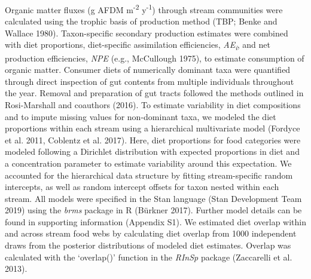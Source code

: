 \documentclass[
]{article}
\numberwithin{equation}
\begin{document}
Organic matter fluxes (g AFDM m\textsuperscript{-2}
y\textsuperscript{-1}) through stream communities were calculated using
the trophic basis of production method (TBP; Benke and Wallace 1980).
Taxon-specific secondary production estimates were combined with diet
proportions, diet-specific assimilation efficiencies,
\emph{AE\textsubscript{i}}, and net production efficiencies, \emph{NPE}
(e.g., McCullough 1975), to estimate consumption of organic matter.
Consumer diets of numerically dominant taxa were quantified through
direct inspection of gut contents from multiple individuals throughout
the year. Removal and preparation of gut tracts followed the methods
outlined in Rosi-Marshall and coauthors (2016). To estimate variability
in diet compositions and to impute missing values for non-dominant taxa,
we modeled the diet proportions within each stream using a hierarchical
multivariate model (Fordyce et al. 2011, Coblentz et al. 2017). Here,
diet proportions for food categories were modeled following a Dirichlet
distribution with expected proportions in diet and a concentration
parameter to estimate variability around this expectation. We accounted
for the hierarchical data structure by fitting stream-specific random
intercepts, as well as random intercept offsets for taxon nested within
each stream. All models were specified in the Stan language (Stan
Development Team 2019) using the \emph{brms} package in R (Bürkner
2017). Further model details can be found in supporting information
(Appendix S1). We estimated diet overlap within and across stream food
webs by calculating diet overlap from 1000 independent draws from the
posterior distributions of modeled diet estimates. Overlap was
calculated with the `overlap()' function in the \emph{RInSp} package
(Zaccarelli et al. 2013).
\end{document}
